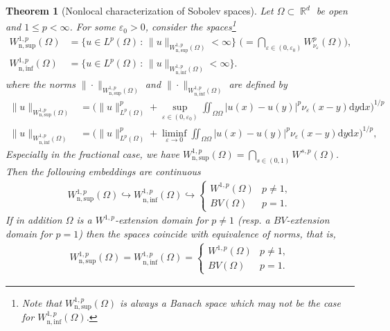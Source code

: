 \documentclass[12pt, reqno]{amsart}%
\theoremstyle{plain}  %
\newtheorem{theorem}{Theorem}[section]
\theoremstyle{definition}  %
\numberwithin{equation}{section}
\DeclareMathOperator{\R}{\mathbb{R}}
\newcommand{\iil}{\iint}
\renewcommand{\d}{\mathrm{d}}
\newcommand{\eps}{\varepsilon}
\begin{document}
\begin{theorem}[{Nonlocal characterization of Sobolev spaces}]\label{thm:BBM-nonloc-conseq}
Let $\Omega\subset \R^d$ be open and  $1\leq p<\infty$. For some  $\eps_0>0$, consider the spaces\footnote{Note  that $W^{1,p}_{\mathrm{n,sup}}(\Omega)$ is always a Banach space which may not be the case for $W^{1,p}_{\mathrm{n,inf}}(\Omega)$. }
\begin{align*}
W^{1,p}_{\mathrm{n,sup}}(\Omega)&=\{u\in L^p(\Omega)\,:\,
\|u\|_{W^{1,p}_{\mathrm{n, sup}}(\Omega)}<\infty \}\, \, \Big(=\bigcap_{\eps\in (0, \eps_0)} W^{p}_{\nu_\eps}(\Omega)\Big),\\
W^{1,p}_{\mathrm{n,inf}}(\Omega)&=\{u\in L^p(\Omega)\,:\,
\|u\|_{W^{1,p}_{\mathrm{n,inf}}(\Omega)}<\infty \}.
\end{align*} where the norms
$\|\cdot\|_{W^{1,p}_{\mathrm{n,sup}}(\Omega)}$  and $\|\cdot\|_{W^{1,p}_{\mathrm{n,inf}}(\Omega)}$ are defined by
\begin{align*}
\|u\|_{W^{1,p}_{\mathrm{n,sup}}(\Omega)}
&=\Big( \|u\|^p_{L^p(\Omega)}+ \sup_{\eps\in (0, \eps_0)} \iil_{ \Omega \Omega}|u(x)-u(y)|^p\nu_\eps(x-y)\d y \d x \Big)^{1/p}\\
\|u\|_{W^{1,p}_{\mathrm{n,inf}}(\Omega)}
&=\Big( \|u\|^p_{L^p(\Omega)}+ \liminf_{\eps\to 0} \iil_{ \Omega \Omega}|u(x)-u(y)|^p\nu_\eps(x-y)\d y \d x \Big)^{1/p},
\end{align*}
 Especially in the  fractional case,  we have $ W^{1,p}_{\mathrm{n,sup}}(\Omega)= \bigcap_{s\in (0,1)} W^{s,p}(\Omega)$.  Then the following embeddings are  continuous
\begin{align*}
W^{1,p}_{\mathrm{n,sup}}(\Omega)
\hookrightarrow W^{1,p}_{\mathrm{n,inf}}(\Omega)
\hookrightarrow
\begin{cases}
W^{1,p}(\Omega) & p\neq1,\\
BV(\Omega) &p=1.
\end{cases}
\end{align*}
If in addition  $\Omega$ is a $W^{1,p}$-extension domain for $p\neq1$ (resp. a $BV$-extension domain for $p=1$) then the spaces coincide with equivalence of norms, that is,
\begin{align*}
W^{1,p}_{\mathrm{n,sup}} (\Omega) =W^{1,p}_{\mathrm{n,inf}}(\Omega) =
\begin{cases}
W^{1,p}(\Omega) & p\neq1,\\
BV(\Omega) &p=1.
\end{cases}
\end{align*}
\end{theorem}
\end{document}
